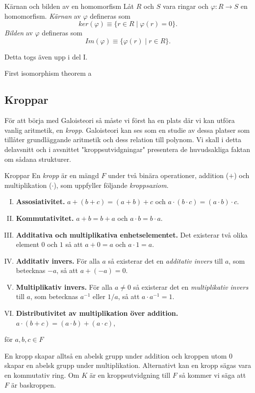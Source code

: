 \documentclass{article}
\theoremstyle{definition}
\begin{document}
\begin{mydef}{Kärnan och bilden av en homomorfism}{}
  Låt $R$ och $S$ vara ringar och $\varphi: R \rightarrow S$ en homomorfism. \textit{Kärnan} av $\varphi$
  defineras som 
  \[ker(\varphi) \equiv \{r \in R \; | \; \varphi(r) = 0\}.\]
  \textit{Bilden} av $\varphi$ defineras som 
  \[Im(\varphi) \equiv \{\varphi(r) \; | \; r \in R\}.\]
\end{mydef}
Detta togs även upp i del I.
\begin{mytheo}{First isomorphism theorem}{}
a  
\end{mytheo}

\subsection{Kroppar}
För att börja med Galoisteori så måste vi först ha en plats där vi kan utföra vanlig aritmetik, en \textit{kropp}. Galoisteori kan ses som en studie 
av dessa platser som tillåter grundläggande aritmetik och dess relation till polynom. Vi skall i detta delavsnitt och i avsnittet "kroppsutvidgningar" 
presentera de huvudsakliga faktan om 
sådana strukturer. 


\begin{mydef}{Kroppar}{}
    En \textit{kropp} är en mängd $F$ under två binära operationer, addition ($+$) och multiplikation ($\cdot$), som uppfyller följande \textit{kroppsaxiom}.
    \begin{enumerate}[I)]
        \item \textbf{Assosiativitet.} $a + (b + c) = (a + b) + c$ och $a \cdot (b \cdot c) = (a \cdot b) \cdot c$.
        \item \textbf{Kommutativitet.} $a + b = b + a$ och $a \cdot b = b \cdot a$.
        \item \textbf{Additativa och multiplikativa enhetselementet.} Det existerar två olika element $0$ och $1$ så att $a + 0 = a$ och $a \cdot 1 = a.$
        \item \textbf{Additativ invers.} För alla $a$ så existerar det en \textit{additativ invers} till $a$, som betecknas
        $-a$, så att $a + (-a) = 0$.
        \item \textbf{Multiplikativ invers.} För alla $a \neq 0$ så existerar det en \textit{multiplikativ invers} till $a$, som betecknas $a^{-1}$ eller $1/a$, så att 
        $a \cdot a^{-1} = 1.$
        \item \textbf{Distributivitet av multiplikation över addition.} $a \cdot (b + c) = (a \cdot b) + (a \cdot c)$,
    \end{enumerate}
    för $a, b, c \in F$
\end{mydef}
En kropp skapar alltså en abelsk grupp under addition och kroppen utom $0$ skapar en abelsk grupp under multiplikation. Alternativt kan en kropp sägas
vara en kommutativ ring. Om $K$ är en kroppsutvidgning till $F$ så kommer vi säga att $F$ är baskroppen. 
\end{document}
